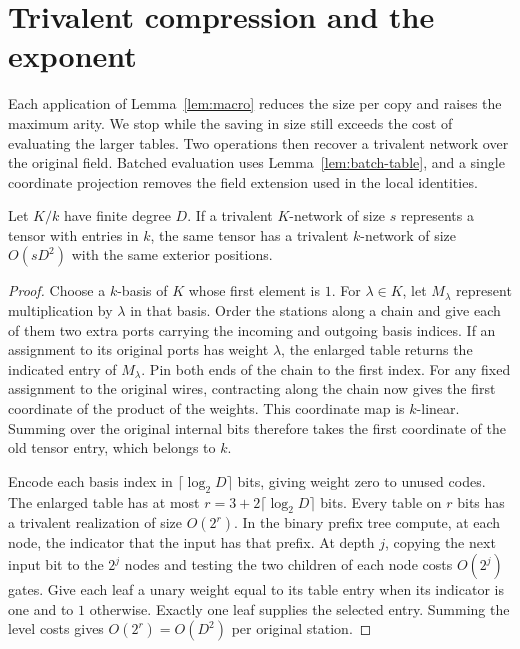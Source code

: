 \section{Trivalent compression and the exponent}\label{sec:shaving}

Each application of Lemma~\ref{lem:macro} reduces the size per copy and
raises the maximum arity. We stop while the saving in size still exceeds
the cost of evaluating the larger tables. Two operations then recover a
trivalent network over the original field. Batched evaluation uses
Lemma~\ref{lem:batch-table}, and a single coordinate projection removes
the field extension used in the local identities.

\begin{lemma}\label{lem:table-descent}
Let $K/k$ have finite degree $D$. If a trivalent $K$-network of size
$s$ represents a tensor with entries in $k$, the same tensor has a
trivalent $k$-network of size $O(sD^2)$ with the same exterior positions.
\end{lemma}

\begin{proof}
Choose a $k$-basis of $K$ whose first element is $1$. For
$\lambda\in K$, let $M_\lambda$ represent multiplication by $\lambda$
in that basis. Order the stations along a chain and give each of them
two extra ports carrying the incoming and outgoing basis indices.
If an assignment to its original ports has weight $\lambda$, the
enlarged table returns the indicated entry of $M_\lambda$. Pin both
ends of the chain to the first index. For any fixed assignment to the
original wires, contracting along the chain now gives the first
coordinate of the product of the weights. This coordinate map is
$k$-linear. Summing over the original internal bits therefore takes
the first coordinate of the old tensor entry, which belongs to $k$.

Encode each basis index in $\lceil\log_2 D\rceil$ bits, giving weight
zero to unused codes. The enlarged table has at most
$r=3+2\lceil\log_2 D\rceil$ bits. Every table on $r$ bits has a
trivalent realization of size $O(2^r)$. In the binary prefix tree
compute, at each node, the indicator that the input has that prefix.
At depth $j$, copying the next input bit to the $2^j$ nodes and testing
the two children of each node costs $O(2^j)$ gates. Give each leaf a
unary weight equal to its table entry when its indicator is one and to
$1$ otherwise. Exactly one leaf supplies the selected entry. Summing
the level costs gives $O(2^r)=O(D^2)$ per original station.
\end{proof}

